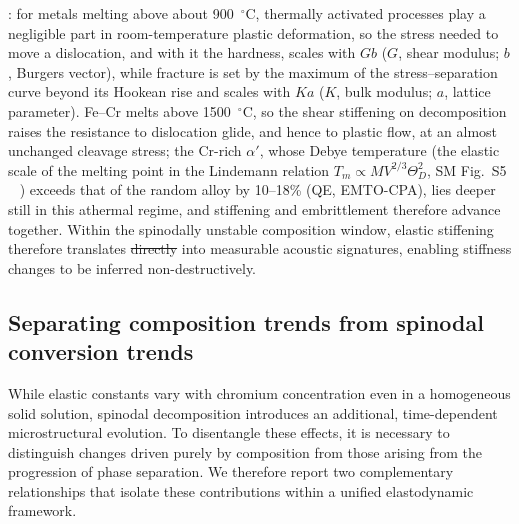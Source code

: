 \documentclass[final,3p,times]{elsarticle}
\makeatletter
\providecommand{\DIFdeltex}[1]{{\protect\color{red}\sout{#1}}} %
\providecommand{\DIFaddend}{} %
\providecommand{\DIFdelbegin}{} %
\providecommand{\DIFdelend}{} %
\providecommand{\DIFdel}[1]{\texorpdfstring{\DIFdeltex{#1}}{}} %
\providecommand{\DIFscaledelfig}{0.5}
\newlength{\DIFdelgraphicswidth} %
\newlength{\DIFdelgraphicsheight} %
\providecommand{\DIFdelincludegraphics}[2][]{%
\sbox{\DIFdelgraphicsbox}{\DIFOincludegraphics[#1]{#2}}%
\settoboxwidth{\DIFdelgraphicswidth}{\DIFdelgraphicsbox} %
\settoboxtotalheight{\DIFdelgraphicsheight}{\DIFdelgraphicsbox} %
\scalebox{\DIFscaledelfig}{%
\parbox[b]{\DIFdelgraphicswidth}{\usebox{\DIFdelgraphicsbox}\\[-\baselineskip] \rule{\DIFdelgraphicswidth}{0em}}\llap{\resizebox{\DIFdelgraphicswidth}{\DIFdelgraphicsheight}{%
\setlength{\unitlength}{\DIFdelgraphicswidth}%
\begin{picture}(1,1)%
\thicklines\linethickness{2pt} %
{\color[rgb]{1,0,0}\put(0,0){\framebox(1,1){}}}%
{\color[rgb]{1,0,0}\put(0,0){\line( 1,1){1}}}%
{\color[rgb]{1,0,0}\put(0,1){\line(1,-1){1}}}%
\end{picture}%
}\hspace*{3pt}}} %
} %
\DeclareRobustCommand{\DIFaddend}{\DIFOaddend \let\includegraphics\DIFOincludegraphics} %
\DeclareRobustCommand{\DIFdelbegin}{\DIFOdelbegin \let\includegraphics\DIFdelincludegraphics} %
\DeclareRobustCommand{\DIFdelend}{\DIFOaddend \let\includegraphics\DIFOincludegraphics} %
\let\sout@orig\sout %
\renewcommand{\sout}[1]{\ifmmode\text{\sout@orig{\ensuremath{#1}}}\else\sout@orig{#1}\fi} %
\makeatother
\begin{document}
{{\cite{pugh1954xcii}}\hskip0pt%
: for metals melting above about 900~$^\circ$C, thermally activated processes play a negligible part in room-temperature plastic deformation, so the stress needed to move a dislocation, and with it the hardness, scales with $Gb$ ($G$, shear modulus; $b$, Burgers vector), while fracture is set by the maximum of the stress--separation curve beyond its Hookean rise and scales with $Ka$ ($K$, bulk modulus; $a$, lattice parameter). Fe--Cr melts above 1500~$^\circ$C, so the shear stiffening on decomposition raises the resistance to dislocation glide, and hence to plastic flow, at an almost unchanged cleavage stress; the Cr-rich $\alpha'$, whose Debye temperature (the elastic scale of the melting point in the Lindemann relation $T_m\propto MV^{2/3}\Theta_D^2$, SM Fig.~S5 \mbox{%
\cite{fine1984elastic}}\hskip0pt%
) exceeds that of the random alloy by 10--18\% (QE, EMTO-CPA), lies deeper still in this athermal regime, and stiffening and embrittlement therefore advance together. }\DIFaddend Within the spinodally unstable composition window, elastic stiffening therefore translates \DIFdelbegin \DIFdel{directly }\DIFdelend into measurable acoustic signatures, enabling stiffness changes to be inferred non-destructively.

\subsection{Separating composition trends from spinodal conversion trends}

While elastic constants vary with chromium concentration even in a homogeneous solid solution, spinodal decomposition introduces an additional, time-dependent microstructural evolution. To disentangle these effects, it is necessary to distinguish changes driven purely by composition from those arising from the progression of phase separation. We therefore report two complementary relationships that isolate these contributions within a unified elastodynamic framework.
\end{document}
